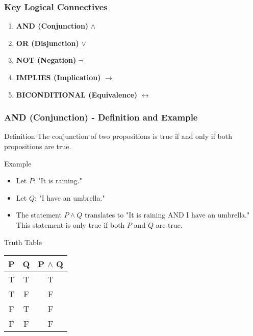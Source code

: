 \documentclass[aspectratio=169]{beamer}
\begin{document}
\begin{frame}[fragile]
    \frametitle{Key Logical Connectives}
    \begin{enumerate}
        \item \textbf{AND (Conjunction)} $\land$
        \item \textbf{OR (Disjunction)} $\lor$
        \item \textbf{NOT (Negation)} $\neg$
        \item \textbf{IMPLIES (Implication)} $\rightarrow$
        \item \textbf{BICONDITIONAL (Equivalence)} $\leftrightarrow$
    \end{enumerate}
\end{frame}

\begin{frame}[fragile]
    \frametitle{AND (Conjunction) - Definition and Example}
    \begin{block}{Definition}
        The conjunction of two propositions is true if and only if both propositions are true. 
    \end{block}
    \begin{block}{Example}
        \begin{itemize}
            \item Let \( P \): "It is raining."
            \item Let \( Q \): "I have an umbrella."
            \item The statement \( P \land Q \) translates to "It is raining AND I have an umbrella." This statement is only true if both \( P \) and \( Q \) are true.
        \end{itemize}
    \end{block}
    \begin{block}{Truth Table}
        \begin{tabular}{|c|c|c|}
            \hline
            P & Q & P $\land$ Q \\
            \hline
            T & T & T \\
            T & F & F \\
            F & T & F \\
            F & F & F \\
            \hline
        \end{tabular}
    \end{block}
\end{frame}
\end{document}

